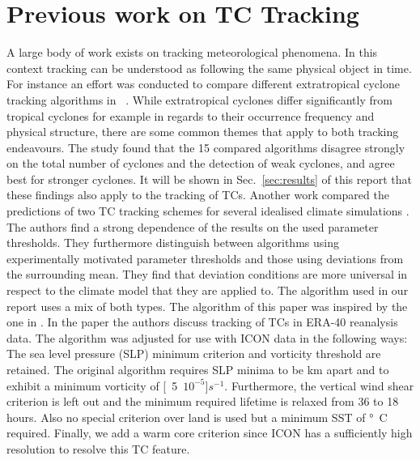 \section{Previous work on TC Tracking}\label{sec:tracking}
A large body of work exists on tracking meteorological phenomena. In this context tracking can be understood as following the same physical object in time.\newline
For instance an effort was conducted to compare different extratropical cyclone tracking algorithms in ~\cite{extratropical}. While extratropical cyclones differ significantly from tropical cyclones for example in regards to their occurrence frequency and physical structure, there are some common themes that apply to both tracking endeavours. The study found that the 15 compared algorithms disagree strongly on the total number of cyclones and the detection of weak cyclones, and agree best for stronger cyclones. It will be shown in Sec.~\ref{sec:results} of this report that these findings also apply to the tracking of TCs.\newline
Another work compared the predictions of two TC tracking schemes for several idealised climate simulations \cite{comp-climate-schemes}. The authors find a strong dependence of the results on the used parameter thresholds. They furthermore distinguish between algorithms using experimentally motivated parameter thresholds and those using deviations from the surrounding mean. They find that deviation conditions are more universal in respect to the climate model that they are applied to. The algorithm used in our report uses a mix of both types.\newline
The algorithm of this paper was inspired by the one in \cite{orig-tracking}. In the paper the authors discuss tracking of TCs in ERA-40 reanalysis data. The algorithm was adjusted for use with ICON data in the following ways: The sea level pressure (SLP) minimum criterion and vorticity threshold are retained. The original algorithm requires SLP minima to be \unit[250]{km} apart and to exhibit a minimum vorticity of \unit[5\times $10^{-5}$]{$s^{-1}$}. Furthermore, the vertical wind shear criterion is left out and the minimum required lifetime is relaxed from 36 to 18 hours. Also no special criterion over land is used but a minimum SST of \unit[24]{\degree C} required. Finally, we add a warm core criterion since ICON has a sufficiently high resolution to resolve this TC feature.